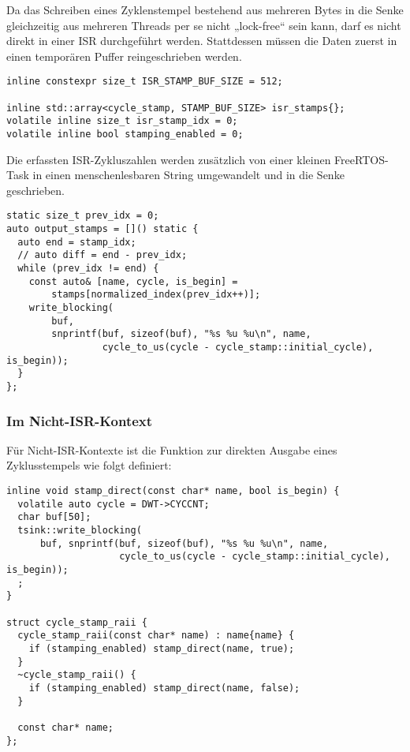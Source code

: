 Da das Schreiben eines Zyklenstempel bestehend aus mehreren Bytes in die Senke
gleichzeitig aus mehreren Threads per se nicht „lock-free“ sein kann, darf es
nicht direkt in einer ISR durchgeführt werden. Stattdessen müssen die Daten
zuerst in einen temporären Puffer reingeschrieben werden.

\begin{code}
\begin{verbatim}
inline constexpr size_t ISR_STAMP_BUF_SIZE = 512;

inline std::array<cycle_stamp, STAMP_BUF_SIZE> isr_stamps{};
volatile inline size_t isr_stamp_idx = 0;
volatile inline bool stamping_enabled = 0;
\end{verbatim}
\end{code}

Die erfassten ISR-Zykluszahlen werden zusätzlich von einer kleinen FreeRTOS-Task
in einen menschenlesbaren String umgewandelt und in die Senke geschrieben.

\begin{code}
    \begin{verbatim}
static size_t prev_idx = 0;
auto output_stamps = []() static {
  auto end = stamp_idx;
  // auto diff = end - prev_idx;
  while (prev_idx != end) {
    const auto& [name, cycle, is_begin] =
        stamps[normalized_index(prev_idx++)];
    write_blocking(
        buf,
        snprintf(buf, sizeof(buf), "%s %u %u\n", name,
                 cycle_to_us(cycle - cycle_stamp::initial_cycle), is_begin));
  }
};
    \end{verbatim}
\end{code}

\subsubsection{Im Nicht-ISR-Kontext}

Für Nicht-ISR-Kontexte ist die Funktion zur direkten Ausgabe eines
Zyklusstempels wie folgt definiert:

\begin{code}
\begin{verbatim}
inline void stamp_direct(const char* name, bool is_begin) {
  volatile auto cycle = DWT->CYCCNT;
  char buf[50];
  tsink::write_blocking(
      buf, snprintf(buf, sizeof(buf), "%s %u %u\n", name,
                    cycle_to_us(cycle - cycle_stamp::initial_cycle), is_begin));
  ;
}

struct cycle_stamp_raii {
  cycle_stamp_raii(const char* name) : name{name} {
    if (stamping_enabled) stamp_direct(name, true);
  }
  ~cycle_stamp_raii() {
    if (stamping_enabled) stamp_direct(name, false);
  }

  const char* name;
};
\end{verbatim}
\end{code}

